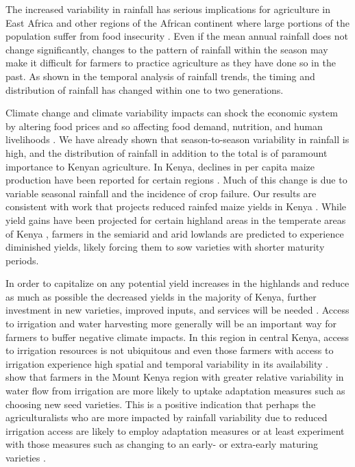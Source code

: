 The increased variability in rainfall has serious implications for agriculture in East Africa and other regions of the African continent where large portions of the population suffer from food insecurity \cite{funk2009declining}. Even if the mean annual rainfall does not change significantly, changes to the pattern of rainfall within the season may make it difficult for farmers to practice agriculture as they have done so in the past. As shown in the temporal analysis of rainfall trends, the timing and distribution of rainfall has changed within one to two generations.

Climate change and climate variability impacts can shock the economic system by altering food prices and so affecting food demand, nutrition, and human livelihoods \cite{herrero2010climate}. We have already shown that season-to-season variability in rainfall is high, and the distribution of rainfall in addition to the total is of paramount importance to Kenyan agriculture. In Kenya, declines in per capita maize production have been reported for certain regions \cite{funka2018a}. Much of this change is due to variable seasonal rainfall and the incidence of crop failure.  Our results are consistent with work that projects reduced rainfed maize yields in Kenya \cite{herrero2010climate, thornton2010adapting}. While yield gains have been projected for certain highland areas in the temperate areas of Kenya \cite{thornton2010adapting}, farmers in the semiarid and arid lowlands are predicted to experience diminished yields, likely forcing them to sow varieties with shorter maturity periods. 

In order to capitalize on any potential yield increases in the highlands and reduce as much as possible the decreased yields in the majority of Kenya, further investment in new varieties, improved inputs, and services will be needed \cite{herrero2010climate, Hansen2011-bk}. Access to irrigation and water harvesting more generally will be an important way for farmers to buffer negative climate impacts. In this region in central Kenya, access to irrigation resources is not ubiquitous and even those farmers with access to irrigation experience high spatial and temporal variability in its availability \cite{gower2016modeling}.  show that farmers in the Mount Kenya region with greater relative variability in water flow from irrigation are more likely to uptake adaptation measures such as choosing new seed varieties. This is a positive indication that perhaps the agriculturalists who are more impacted by rainfall variability due to reduced irrigation access are likely to employ adaptation measures or at least experiment with those measures such as changing to an early- or extra-early maturing varieties \cite{mccord2018assessing}. 

